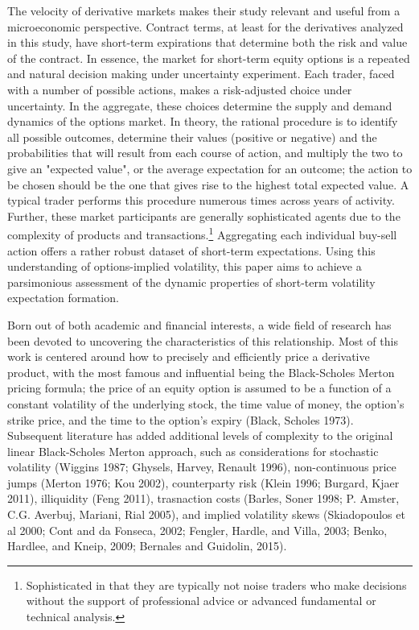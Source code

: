\documentclass[11pt,a4paper,oldfontcommands]{memoir}
\begin{document}
The velocity of derivative markets makes their study relevant and useful from a microeconomic perspective. Contract terms, at least for the derivatives analyzed in this study, have short-term expirations that determine both the risk and value of the contract. In essence, the market for short-term equity options is a repeated and natural decision making under uncertainty experiment. Each trader, faced with a number of possible actions, makes a risk-adjusted choice under uncertainty. In the aggregate, these choices determine the supply and demand dynamics of the options market. In theory, the rational procedure is to identify all possible outcomes, determine their values (positive or negative) and the probabilities that will result from each course of action, and multiply the two to give an "expected value", or the average expectation for an outcome; the action to be chosen should be the one that gives rise to the highest total expected value. A typical trader performs this procedure numerous times across years of activity. Further, these market participants are generally sophisticated agents due to the complexity of products and transactions.\footnote{Sophisticated in that they are typically not noise traders who make decisions without the support of professional advice or advanced fundamental or technical analysis.} Aggregating each individual buy-sell action offers a rather robust dataset of short-term expectations. Using this understanding of options-implied volatility, this paper aims to achieve a parsimonious assessment of the dynamic properties of short-term volatility expectation formation. 


Born out of both academic and financial interests, a wide field of research has been devoted to uncovering the characteristics of this relationship. Most of this work is centered around how to precisely and efficiently price a derivative product, with the most famous and influential being the Black-Scholes Merton pricing formula; the price of an equity option is assumed to be a function of a constant volatility of the underlying stock, the time value of money, the option's strike price, and the time to the option's expiry (Black, Scholes 1973). Subsequent literature has added additional levels of complexity to the original linear Black-Scholes Merton approach, such as considerations for stochastic volatility (Wiggins 1987; Ghysels, Harvey, Renault 1996), non-continuous price jumps (Merton 1976; Kou 2002), counterparty risk (Klein 1996; Burgard, Kjaer 2011), illiquidity (Feng 2011), trasnaction costs (Barles, Soner 1998; P. Amster, C.G. Averbuj, Mariani, Rial 2005), and implied volatility skews (Skiadopoulos et al 2000; Cont and da Fonseca, 2002; Fengler, Hardle, and Villa, 2003; Benko, Hardlee, and Kneip, 2009; Bernales and Guidolin, 2015).
\end{document}
